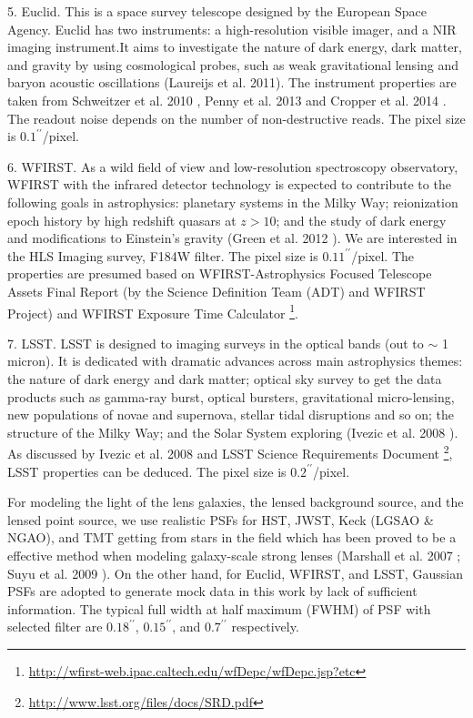 \documentclass[a4paper,11pt]{article}
\begin{document}
    5. Euclid. This is a space survey telescope designed by the European Space Agency. Euclid has two instruments: a high-resolution visible imager, and a NIR imaging instrument.It aims to investigate the nature of dark energy, dark matter, and gravity by using cosmological probes, such as weak gravitational lensing and baryon acoustic oscillations (Laureijs et al. 2011). The instrument properties are taken from Schweitzer et al. 2010 \cite{2010SPIE.7731E..1KS}, Penny et al. 2013 \cite{2013MNRAS.434....2P} and Cropper et al. 2014 \cite{2014SPIE.9143E..0JC}. The readout noise depends on the number of non-destructive reads. The pixel size is $0.1^{\prime\prime}$/pixel.
    
    6. WFIRST. As a wild field of view and low-resolution spectroscopy observatory, WFIRST with the infrared detector technology is expected to contribute to the following goals in astrophysics: planetary systems in the Milky Way; reionization epoch history by high redshift quasars at $z>10$; and the study of dark energy and modifications to Einstein's gravity (Green et al. 2012 \cite{2012arXiv1208.4012G}). We are interested in the HLS Imaging survey, F184W filter. The pixel size is $0.11^{\prime\prime}$/pixel. The properties are presumed based on WFIRST-Astrophysics Focused Telescope Assets Final Report (by the Science Definition Team (ADT) and WFIRST Project) and WFIRST Exposure Time Calculator \footnote{\url{http://wfirst-web.ipac.caltech.edu/wfDepc/wfDepc.jsp?etc}}.
    
    7. LSST. LSST is designed to imaging surveys in the optical bands (out to $\sim$ 1 micron). It is dedicated with dramatic advances across main astrophysics themes: the nature of dark energy and dark matter; optical sky survey to get the data products such as gamma-ray burst, optical bursters, gravitational micro-lensing, new populations of novae and supernova, stellar tidal disruptions and so on; the structure of the Milky Way; and the Solar System exploring (Ivezic et al. 2008 \cite{2008arXiv0805.2366I}). As discussed by Ivezic et al. 2008 and LSST Science Requirements Document \footnote{\url{http://www.lsst.org/files/docs/SRD.pdf}}, LSST properties can be deduced. The pixel size is $0.2^{\prime\prime}$/pixel.

For modeling the light of the lens galaxies, the lensed background source, and the lensed point source, we use realistic PSFs for HST, JWST, Keck (LGSAO \& NGAO), and TMT getting from stars in the field which has been proved to be a effective method when modeling galaxy-scale strong lenses (Marshall et al. 2007 \cite{2007ApJ...671.1196M}; Suyu et al. 2009 \cite{2009ApJ...691..277S}). On the other hand, for Euclid, WFIRST, and LSST, Gaussian PSFs are adopted to generate mock data in this work by lack of sufficient information. The typical full width at half maximum (FWHM) of PSF with selected filter are $0.18^{\prime\prime}$, $0.15^{\prime\prime}$, and $0.7^{\prime\prime}$ respectively.
\end{document}
